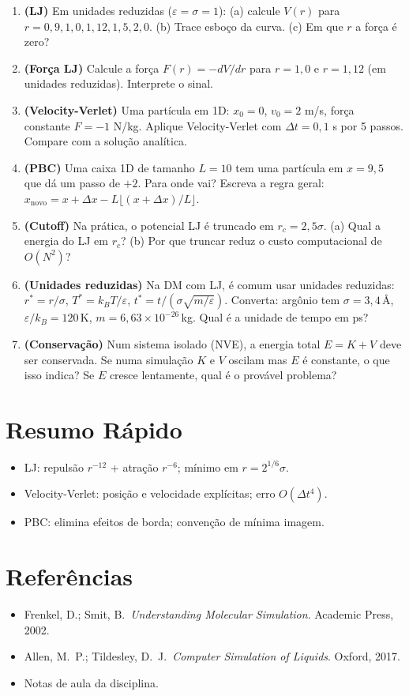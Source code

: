 \documentclass[12pt,a4paper]{article}
\begin{document}
\begin{enumerate}
  \item \textbf{(LJ)} Em unidades reduzidas ($\varepsilon=\sigma=1$): (a) calcule $V(r)$ para $r=0{,}9, 1{,}0, 1{,}12, 1{,}5, 2{,}0$. (b) Trace esbo\c{c}o da curva. (c) Em que $r$ a for\c{c}a \'e zero?
  
  \item \textbf{(For\c{c}a LJ)} Calcule a for\c{c}a $F(r) = -dV/dr$ para $r=1{,}0$ e $r=1{,}12$ (em unidades reduzidas). Interprete o sinal.
  
  \item \textbf{(Velocity-Verlet)} Uma part\'icula em 1D: $x_0=0$, $v_0=2$ m/s, for\c{c}a constante $F=-1$ N/kg. Aplique Velocity-Verlet com $\Delta t=0{,}1$ s por 5 passos. Compare com a solu\c{c}\~ao anal\'itica.
  
  \item \textbf{(PBC)} Uma caixa 1D de tamanho $L=10$ tem uma part\'icula em $x=9{,}5$ que d\'a um passo de $+2$. Para onde vai? Escreva a regra geral: $x_\text{novo} = x + \Delta x - L\lfloor(x+\Delta x)/L\rfloor$.
  
  \item \textbf{(Cutoff)} Na pr\'atica, o potencial LJ \'e truncado em $r_c = 2{,}5\sigma$. (a) Qual a energia do LJ em $r_c$? (b) Por que truncar reduz o custo computacional de $O(N^2)$?
  
  \item \textbf{(Unidades reduzidas)} Na DM com LJ, \'e comum usar unidades reduzidas: $r^* = r/\sigma$, $T^* = k_BT/\varepsilon$, $t^* = t/(\sigma\sqrt{m/\varepsilon})$. Converta: argônio tem $\sigma=3{,}4$\,\AA, $\varepsilon/k_B=120$\,K, $m=6{,}63\times10^{-26}$\,kg. Qual \'e a unidade de tempo em ps?
  
  \item \textbf{(Conserva\c{c}\~ao)} Num sistema isolado (NVE), a energia total $E = K + V$ deve ser conservada. Se numa simula\c{c}\~ao $K$ e $V$ oscilam mas $E$ \'e constante, o que isso indica? Se $E$ cresce lentamente, qual \'e o prov\'avel problema?
\end{enumerate}

\section*{Resumo R\'apido}
\begin{itemize}
  \item LJ: repuls\~ao $r^{-12}$ + atra\c{c}\~ao $r^{-6}$; m\'inimo em $r=2^{1/6}\sigma$.
  \item Velocity-Verlet: posi\c{c}\~ao e velocidade expl\'icitas; erro $O(\Delta t^4)$.
  \item PBC: elimina efeitos de borda; conven\c{c}\~ao de m\'inima imagem.
\end{itemize}

\section*{Refer\^encias}
\begin{itemize}
  \item Frenkel, D.; Smit, B.\ \textit{Understanding Molecular Simulation}. Academic Press, 2002.
  \item Allen, M.\ P.; Tildesley, D.\ J.\ \textit{Computer Simulation of Liquids}. Oxford, 2017.
  \item Notas de aula da disciplina.
\end{itemize}
\end{document}

